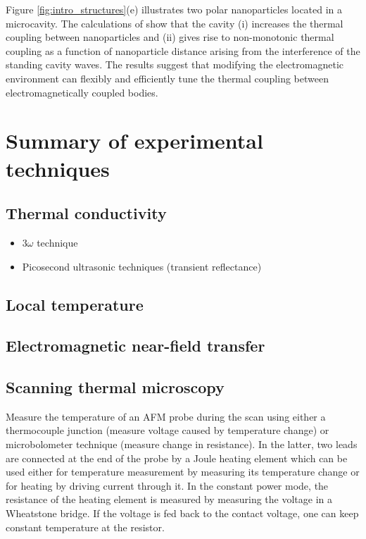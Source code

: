 Figure \ref{fig:intro_structures}(e) illustrates two polar nanoparticles located in a microcavity. The calculations of  show that the cavity (i) increases the thermal coupling between nanoparticles and (ii) gives rise to non-monotonic thermal coupling as a function of nanoparticle distance arising from the interference of the standing cavity waves. The results suggest that modifying the electromagnetic environment can flexibly and efficiently tune the thermal coupling between electromagnetically coupled bodies.



\iffalse
\section{Summary of experimental techniques}

\subsection{Thermal conductivity}

\begin{itemize}
 \item $3\omega$ technique
 \item Picosecond ultrasonic techniques (transient reflectance)
\end{itemize}

\subsection{Local temperature}

\subsection{Electromagnetic near-field transfer}

\subsection{Scanning thermal microscopy}

Measure the temperature of an AFM probe during the scan using either a thermocouple junction (measure voltage caused by temperature change) or microbolometer technique (measure change in resistance). In the latter, two leads are connected at the end of the probe by a Joule heating element which can be used either for temperature measurement by measuring its temperature change or for heating by driving current through it. In the constant power mode, the resistance of the heating element is measured by measuring the voltage in a Wheatstone bridge. If the voltage is fed back to the contact voltage, one can keep constant temperature at the resistor. 

